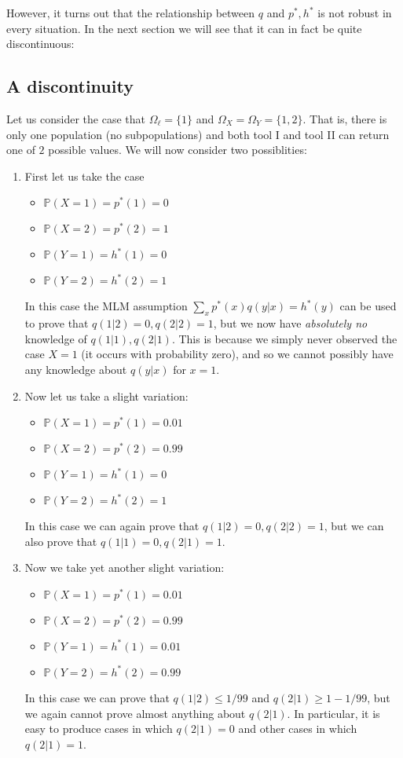 
However, it turns out that the relationship between $q$ and $p^*,h^*$ is not robust in every situation.  In the next section we will see that it can in fact be quite discontinuous:

\subsection{A discontinuity}

Let us consider the case that $\Omega_\ell = \{1\}$ and $\Omega_X=\Omega_Y=\{1,2\}$.  That is, there is only one population (no subpopulations) and both tool I and tool II can return one of $2$ possible values.  We will now consider two possiblities:
\begin{enumerate}
\item First let us take the case
    \begin{itemize}
    \item $\mathbb{P}(X=1)=p^*(1)=0$
    \item $\mathbb{P}(X=2)=p^*(2)=1$
    \item $\mathbb{P}(Y=1)=h^*(1)=0$
    \item $\mathbb{P}(Y=2)=h^*(2)=1$
    \end{itemize}
    In this case the MLM assumption $\sum_x p^*(x)q(y|x)=h^*(y)$ can be used to prove that $q(1|2)=0,q(2|2)=1$, but we now have \emph{absolutely no} knowledge of $q(1|1),q(2|1)$.  This is because we simply never observed the case $X=1$ (it occurs with probability zero), and so we cannot possibly have any knowledge about $q(y|x)$ for $x=1$.  
\item Now let us take a slight variation:
    \begin{itemize}
    \item $\mathbb{P}(X=1)=p^*(1)=0.01$
    \item $\mathbb{P}(X=2)=p^*(2)=0.99$
    \item $\mathbb{P}(Y=1)=h^*(1)=0$
    \item $\mathbb{P}(Y=2)=h^*(2)=1$
    \end{itemize}
    In this case we can again prove that $q(1|2)=0,q(2|2)=1$, but we can also prove that $q(1|1)=0,q(2|1)=1$.  
\item Now we take yet another slight variation:
    \begin{itemize}
    \item $\mathbb{P}(X=1)=p^*(1)=0.01$
    \item $\mathbb{P}(X=2)=p^*(2)=0.99$
    \item $\mathbb{P}(Y=1)=h^*(1)=0.01$
    \item $\mathbb{P}(Y=2)=h^*(2)=0.99$
    \end{itemize}
    In this case we can prove that $q(1|2)\leq 1/99$ and $q(2|1)\geq 1-1/99$, but we again cannot prove almost anything about $q(2|1)$.  In particular, it is easy to produce cases in which $q(2|1)=0$ and other cases in which $q(2|1)=1$.  

\end{enumerate}

